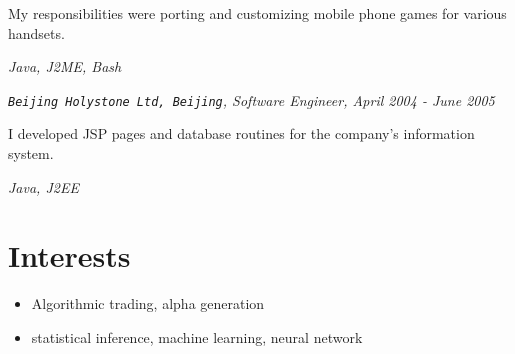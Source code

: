 \documentclass[a4paper]{twentysecondcv} %
\newenvironment{aperiod}{
  \begin{list}{}{
    \setlength{\leftmargin}{1.5em}
    \setlength{\itemsep}{1em}
    \setlength{\parskip}{0pt}
    \setlength{\parsep}{0.25em}
  }
}{
  \end{list}
}
\begin{document}
\begin{aperiod}
  My responsibilities were porting and customizing mobile
  phone games for various handsets.

  {\it Java, J2ME, Bash}
\item {\it {\tt Beijing Holystone Ltd, Beijing}, Software
    Engineer, April 2004 - June 2005}

  I developed JSP pages and database routines for
  the company's information system.

  {\it Java, J2EE}
\end{aperiod}

\section{Interests}
\begin{itemize}
\item Algorithmic trading, alpha generation
\item statistical inference, machine learning, neural network
\end{itemize}
\end{document}
